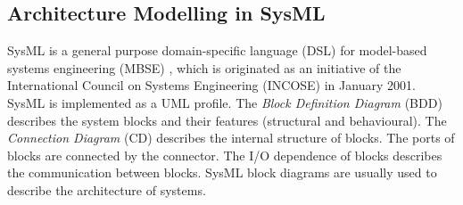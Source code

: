 \subsection{Architecture Modelling in SysML}

\begin{figure}[htbp]
\end{figure}

SysML is a general purpose domain-specific language (DSL) \cite{SemerathBHSV17} for model-based systems engineering (MBSE) \cite{Dori16}, which is originated as an initiative of the International Council on Systems Engineering (INCOSE) \cite{Pepper2015International} in January 2001. SysML is implemented as a UML profile. The \textit{Block Definition Diagram }(BDD) describes the system blocks and their features (structural and behavioural). The\textit{ Connection Diagram} (CD) describes the internal structure of blocks. The ports of blocks are connected by the connector. The I/O dependence of blocks describes the communication between blocks. SysML block diagrams are usually used to describe the architecture of systems.


